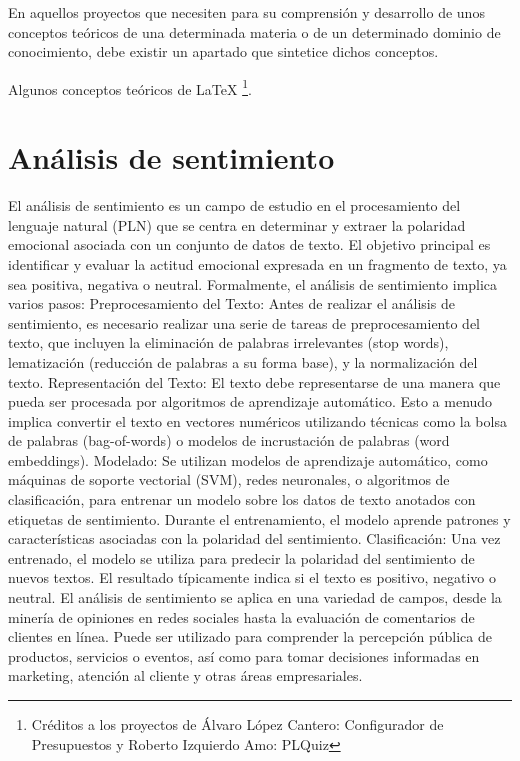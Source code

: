 
En aquellos proyectos que necesiten para su comprensión y desarrollo de unos conceptos teóricos de una determinada materia o de un determinado dominio de conocimiento, debe existir un apartado que sintetice dichos conceptos.

Algunos conceptos teóricos de \LaTeX{} \footnote{Créditos a los proyectos de Álvaro López Cantero: Configurador de Presupuestos y Roberto Izquierdo Amo: PLQuiz}.

\section{Análisis de sentimiento}
El análisis de sentimiento es un campo de estudio en el procesamiento del lenguaje natural (PLN) que se centra en determinar y extraer la polaridad emocional asociada con un conjunto de datos de texto. El objetivo principal es identificar y evaluar la actitud emocional expresada en un fragmento de texto, ya sea positiva, negativa o neutral.
Formalmente, el análisis de sentimiento implica varios pasos:
Preprocesamiento del Texto: Antes de realizar el análisis de sentimiento, es necesario realizar una serie de tareas de preprocesamiento del texto, que incluyen la eliminación de palabras irrelevantes (stop words), lematización (reducción de palabras a su forma base), y la normalización del texto.
Representación del Texto: El texto debe representarse de una manera que pueda ser procesada por algoritmos de aprendizaje automático. Esto a menudo implica convertir el texto en vectores numéricos utilizando técnicas como la bolsa de palabras (bag-of-words) o modelos de incrustación de palabras (word embeddings).
Modelado: Se utilizan modelos de aprendizaje automático, como máquinas de soporte vectorial (SVM), redes neuronales, o algoritmos de clasificación, para entrenar un modelo sobre los datos de texto anotados con etiquetas de sentimiento. Durante el entrenamiento, el modelo aprende patrones y características asociadas con la polaridad del sentimiento.
Clasificación: Una vez entrenado, el modelo se utiliza para predecir la polaridad del sentimiento de nuevos textos. El resultado típicamente indica si el texto es positivo, negativo o neutral.
El análisis de sentimiento se aplica en una variedad de campos, desde la minería de opiniones en redes sociales hasta la evaluación de comentarios de clientes en línea. Puede ser utilizado para comprender la percepción pública de productos, servicios o eventos, así como para tomar decisiones informadas en marketing, atención al cliente y otras áreas empresariales.


